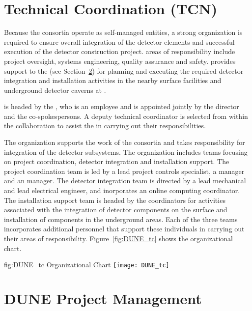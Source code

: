 \section{Technical Coordination (TCN)}
\label{sec:tc}

Because the consortia operate as self-managed entities, a strong
 organization is required to ensure overall integration of
the detector elements and successful execution of the detector
construction project.   areas of responsibility include project
oversight, systems engineering, quality assurance and safety.
 provides support to the  (see
Section~\ref{sec:pm}) for planning and executing the required detector
integration and installation activities in the nearby surface
facilities and underground detector caverns at \surf.

 is headed by the , who is an 
employee and is appointed jointly by the  director and the
 co-spokespersons.  A deputy technical coordinator is
selected from within the collaboration to assist the  in
carrying out their responsibilities.

The  organization supports the work of the consortia and
takes responsibility for integration of the detector
subsystems.  The organization includes teams focusing on project
coordination, detector integration and installation support.  The
project coordination team is led by a lead project controls
specialist, a  manager and an  manager.  The
detector integration team is directed by a lead mechanical and lead
electrical engineer, and inorporates an online computing coordinator.
The installation support team is headed by the coordinators for
activities associated with the integration of detector components on
the surface and installation of components in the underground areas.
Each of the three teams incorporates additional personnel that support
these individuals in carrying out their areas of responsibility.
Figure~\ref{fig:DUNE_tc} shows the   organizational chart.
\begin{dunefigure}{fig:DUNE_tc}
  {  Organizational Chart}
  \texttt{[image: DUNE\_tc]}
\end{dunefigure}



\section{DUNE Project Management}
\label{sec:pm}

